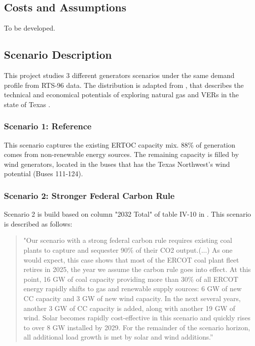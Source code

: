 \documentclass[12pt,LUDisStyle,twosided]{book}
\begin{document}
\subsection{Costs and Assumptions}

To be developed.

\subsection{Scenario Description}

This project studies 3 different generators scenarios under the same demand profile from RTS-96 data. The distribution is adapted from \citeauthor{shavel}, that describes the technical and economical potentials of exploring natural gas and VERs in the state of Texas \cite{shavel}. 

\subsubsection{Scenario 1: Reference}

This scenario captures the existing ERTOC capacity mix. 88\% of generation comes from non-renewable energy sources. The remaining capacity is filled by wind generators, located in the buses that has the Texas Northwest's wind potential (Buses 111-124).

\subsubsection{Scenario 2: Stronger Federal Carbon Rule}

Scenario 2 is build based on column "2032 Total" of table IV-10 in \cite{shavel}. This scenario is described as follows:

\begin{quotation}
"Our scenario with a strong federal carbon rule requires existing coal plants to capture and sequester 90\% of their CO2 output.(...)
As one would expect, this case shows that most of the ERCOT coal plant fleet retires in 2025, the year we assume the carbon rule goes into effect. At this point, 16 GW of coal capacity providing more than 30\% of all ERCOT energy rapidly shifts to gas and renewable supply sources: 6 GW of new CC capacity and 3 GW of new wind capacity. In the next several years, another 3 GW of CC capacity is added, along with another 19 GW of wind. Solar becomes rapidly cost-effective in this scenario and quickly rises to over 8 GW installed by 2029. For the remainder of the scenario horizon, all additional load growth is met by solar and wind additions.”
\end{quotation}
\end{document}

